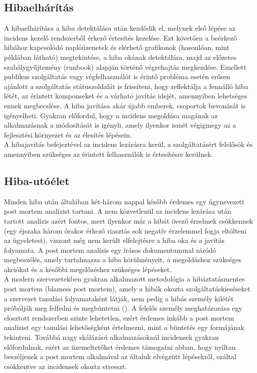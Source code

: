 \subsection*{Hibaelhárítás}
A hibaelhárítása a hiba detektálása után kezdődik el, melynek első lépése az incidens kezelő rendszerből érkező értesítés kezelése. Ezt követően a beérkező hibához kapcsolódó naplóüzenetek és elérhető grafikonok (hasonlóan, mint  példában látható) megtekintése, a hiba okának detektálása, majd az előzetes szabálygyűjtemény (runbook) alapján történő végrehajtás megkezdése.
Emellett publikus szolgáltatás vagy végfelhasználót is érintő probléma esetén erősen ajánlott a szolgáltatás státuszoldalát is frissíteni, hogy reflektálja a fennálló hiba létét, az érintett komponseket és a várható javítás idejét, amennyiben lehetséges ennek megbecslése. A hiba javítása akár újabb emberek, csoportok bevonását is igényelheti. Gyakran előfordul, hogy a incidens megoldása magának az alkalmazásnak a módosítását is igényli, amely ilyenkor ismét végigmegy az a fejlesztési környezet és az élesítés lépésein.\hfill\\
A hibajavítás befejeztével az incidens lezárásra kerül, a szolgáltatásért felelősök és  amennyiben szükséges az érintett felhasználók is értesítésre kerülnek.

\subsection*{Hiba-utóélet}
Minden hiba után általában két-három nappal később érdemes egy úgynevezett post mortem analízist tartani. A nem közvetlenül az incidens lezárása után tartott analízis azért fontos, mert ilyenkor már a hibát övező érzelmek csökkennek (egy éjszaka három órakor érkező riasztás sok negatív érzelemmel fogja eltölteni az ügyeletest), viszont még nem került elfelejtésre a hiba oka és a javítás folyamata. A post mortem analízis egy írásos dokumentummal záródó megbeszélés, amely tartalmazza a hiba körülményeit, a megoldáshoz szükséges akciókat és a későbbi megelőzéshez szükséges lépéseket.\hfill\\
A modern szervezetekben gyakran alkalmazott metodológia a hibáztatásmentes post mortem (blamess post mortem), amely a hibák okozta szolgáltatáskieséseket a szervezet tanulási folyamataként látják, nem pedig a hibás személy kilétét próbálják meg felfedni és megbüntetni (\cite{blameless_post_mortem}).
A felelős személy meghatározása egy elosztott rendszerben szinte lehetetlen, ezért érdemes inkább a post mortem analízist egy tanulási lehetőségként értelmezni, mint a büntetés egy formájának tekinteni. Továbbá nagy skálázású alkalmazásoknál incidensek gyakran előfordulnak, ezért az üzemeltetőket érdemes támogatni abban, hogy nyíltan beszéljenek a post mortem alkalmával az általuk elvégzütt lépésekről, ezáltal csökkentve az incidensek okozta stresszt.
